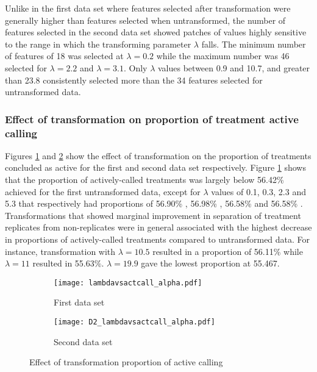 \documentclass[11pt]{article}
\begin{document}
\par{Unlike in the first data set where features selected after transformation were generally higher than features selected when untransformed, the number of features selected in the second data set showed patches of values highly sensitive to the range in which the transforming parameter $\lambda $ falls. The minimum number of features of 18 was selected at $\lambda = 0.2 $ while the maximum number was 46 selected for $\lambda = 2.2 $ and $\lambda = 3.1 $. Only $\lambda $ values between 0.9 and 10.7, and greater than 23.8 consistently selected more than the 34 features selected for untransformed data.}

\subsubsection*{Effect of transformation on proportion of treatment active calling}
\par{Figures \ref{acall1} and \ref{acall2} show the effect of transformation on the proportion of treatments concluded as active for the first and second data set respectively. Figure \ref{acall1} shows that the proportion of actively-called treatments was largely below 56.42\% achieved for the first untransformed data, except for $\lambda$ values of 0.1, 0.3, 2.3 and 5.3 that respectively had proportions of 56.90\% , 56.98\% , 56.58\%  and 56.58\% . Transformations that showed marginal improvement in separation of treatment replicates from non-replicates were in general associated with the highest decrease in proportions of actively-called treatments compared to untransformed data. For instance, transformation with $\lambda = 10.5$ resulted in a proportion of 56.11\% while $\lambda = 11$ resulted in 55.63\%. $\lambda = 19.9$ gave the lowest proportion at 55.467. }%

\begin{figure}[!ht] 
\centering
  \begin{subfigure}{0.55\textwidth}
    \centering
    \texttt{[image: lambdavsactcall\_alpha.pdf]} 
\caption{First data set}
  \label{acall1}
  \end{subfigure}%
  \begin{subfigure}{0.55\textwidth}
    \centering
    \texttt{[image: D2\_lambdavsactcall\_alpha.pdf]} 
    \caption[Second data set]{Second data set} 
    \label{acall2} 
    \vspace{0ex}
  \end{subfigure} 
\caption[Effect of transformation proportion of active calling]{Effect of transformation proportion of active calling}
  \label{acall} 
\end{figure}
\end{document}
